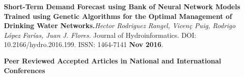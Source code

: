 \documentclass[10pt]{article}
\newenvironment{innerlist}[1][\enskip\textbullet]%
        {\begin{compactitem}[#1]}{\end{compactitem}}
\newcommand{\blankline}{\quad\pagebreak[2]}
\begin{document}
\begin{innerlist}
\item \textbf{Short-Term Demand Forecast using Bank of Neural Network Models Trained using Genetic Algorithms for the Optimal Management of Drinking Water Networks.}\textit{Hector Rodriguez Rangel, Vicen\c{c} Puig, Rodrigo López Farías, Juan J. Flores.}  {Journal of Hydroinformatics}. DOI: 10.2166/hydro.2016.199. ISSN: 1464-7141 \textbf{Nov 2016}.





\end{innerlist}




\blankline


\textbf{Peer Reviewed Accepted Articles in National and International Conferences}
\end{document}

